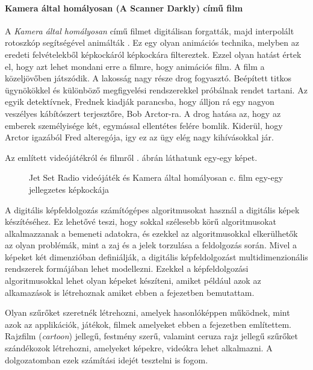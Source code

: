 \paragraph{Kamera által homályosan (A Scanner Darkly) című film} 

A \textit{Kamera által homályosan} című filmet digitálisan forgatták, majd interpolált rotoszkóp segítségével animálták \cite{scannerdarkly}. Ez egy olyan animációs technika, melyben az eredeti felvételekből képkockáról képkockára filtereztek. Ezzel olyan hatást értek el, hogy azt lehet mondani erre a filmre, hogy animációs film. A film a közeljövőben játszódik. A lakosság nagy része drog fogyasztó. Beépített titkos ügynökökkel és különböző megfigyelési rendszerekkel próbálnak rendet tartani. Az egyik detektívnek, Frednek kiadják parancsba, hogy álljon rá egy nagyon veszélyes kábítószert terjesztőre, Bob Arctor-ra. A drog hatása az, hogy az emberek személyisége két, egymással ellentétes felére bomlik. Kiderül, hogy Arctor igazából Fred alteregója, igy ez az ügy elég nagy kihívásokkal jár. 

Az említett videójátékról és filmről . ábrán láthatunk egy-egy képet.

\begin{figure}[ht]
\centering
{}
\caption{Jet Set Radio videójáték és Kamera által homályosan c. film egy-egy jellegzetes képkockája} 
\label{fig:jetset}
\end{figure}


A digitális képfeldolgozás számítógépes algoritmusokat használ a digitális képek készítéséhez. Ez lehetővé teszi, hogy sokkal szélesebb körű algoritmusokat alkalmazzanak a bemeneti adatokra, és ezekkel az algoritmusokkal elkerülhetők az olyan problémák, mint a zaj és a jelek torzulása a feldolgozás során. Mivel a képeket két dimenzióban definiálják, a digitális képfeldolgozást multidimenzionális rendszerek formájában lehet modellezni.  Ezekkel a képfeldolgozási algoritmusokkal lehet olyan képeket készíteni, amiket például azok az alkamazások is létrehoznak amiket ebben a fejezetben bemutattam.



Olyan szűrőket szeretnék létrehozni, amelyek hasonlóképpen működnek, mint azok az applikációk, játékok, filmek amelyeket ebben a fejezetben említettem. Rajzfilm (\textit{cartoon}) jellegű, festmény szerű, valamint ceruza rajz jellegű szűrőket szándékozok létrehozni, amelyeket képekre, videókra lehet alkalmazni. A dolgozatomban ezek számítási idejét tesztelni is fogom.
